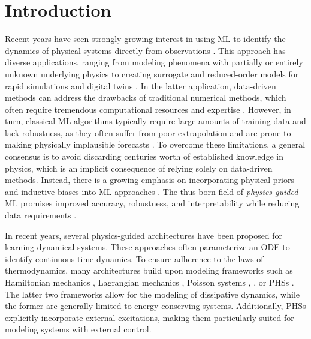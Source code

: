 \section{Introduction}\label{sec:introduction}

Recent years have seen strongly growing interest in using \gls{ML} to identify the dynamics of physical systems directly from observations \cite{legaard2023,lee2021,lai2021,boettcher2023,park2024,wang2021,ramasinghe2023}. 
This approach has diverse applications, ranging from modeling phenomena with partially or entirely unknown underlying physics to creating surrogate and reduced-order models for rapid simulations and digital twins \cite{willard2022, wang2021, kannapinn2024}. In the latter application, data-driven methods can address the drawbacks of traditional numerical methods, which often require tremendous computational resources and expertise \cite{wang2021,abbasi2024}. However, in turn, classical \gls{ML} algorithms typically require large amounts of training data and lack robustness, as they often suffer from poor extrapolation and are prone to making physically implausible forecasts \cite{abbasi2024,wang2021,willard2022,liu2019a}.
To overcome these limitations, a general consensus is to avoid discarding centuries worth of established knowledge in physics, which is an implicit consequence of relying solely on data-driven methods. Instead, there is a growing emphasis on incorporating physical priors and inductive biases into \gls{ML} approaches \cite{willard2022,liu2019a}. 
The thus-born field of \emph{physics-guided} \gls{ML} promises improved accuracy, robustness, and interpretability while reducing data requirements \cite{wang2021,liu2019a}. 

In recent years, several physics-guided architectures have been proposed for learning dynamical systems. These approaches often parameterize an \gls{ODE} to identify continuous-time dynamics. 
To ensure adherence to the laws of thermodynamics, many architectures build upon modeling frameworks such as Hamiltonian mechanics \cite{greydanus2019,jin2020,choudhary2021}, Lagrangian mechanics \cite{lutter2019,cranmer2020}, Poisson systems \cite{jin2023},  \cite{hernandez2021,zhang2022}, or \glspl{PHS} \cite{zhong2020,desai2021,eidnes2023,neary2023}. 
The latter two frameworks allow for the modeling of dissipative dynamics, while the former are generally limited to energy-conserving systems. 
Additionally, \glspl{PHS} explicitly incorporate external excitations, making them particularly suited for modeling systems with external control.

